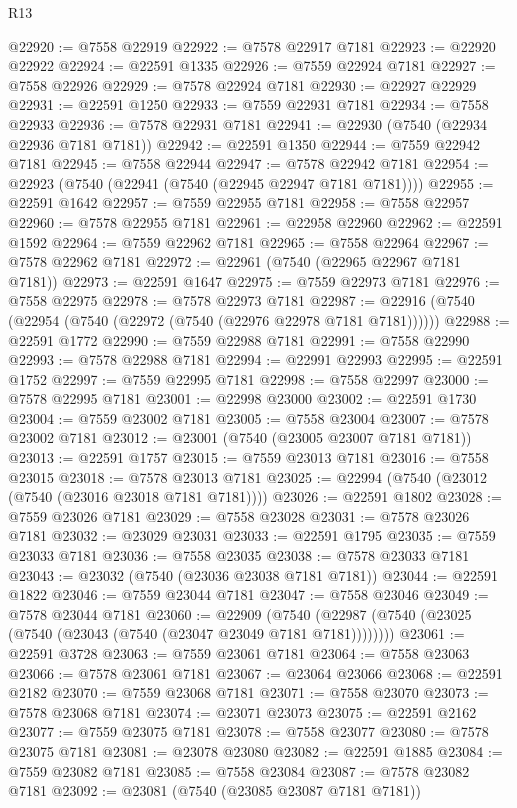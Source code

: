 \begin{lexlean}{R13}
\begin{coremodule}
@22920 := @7558 @22919
@22922 := @7578 @22917 @7181
@22923 := @22920 @22922
@22924 := @22591 @1335
@22926 := @7559 @22924 @7181
@22927 := @7558 @22926
@22929 := @7578 @22924 @7181
@22930 := @22927 @22929
@22931 := @22591 @1250
@22933 := @7559 @22931 @7181
@22934 := @7558 @22933
@22936 := @7578 @22931 @7181
@22941 := @22930 (@7540 (@22934 @22936 @7181 @7181))
@22942 := @22591 @1350
@22944 := @7559 @22942 @7181
@22945 := @7558 @22944
@22947 := @7578 @22942 @7181
@22954 := @22923 (@7540 (@22941 (@7540 (@22945 @22947 @7181 @7181))))
@22955 := @22591 @1642
@22957 := @7559 @22955 @7181
@22958 := @7558 @22957
@22960 := @7578 @22955 @7181
@22961 := @22958 @22960
@22962 := @22591 @1592
@22964 := @7559 @22962 @7181
@22965 := @7558 @22964
@22967 := @7578 @22962 @7181
@22972 := @22961 (@7540 (@22965 @22967 @7181 @7181))
@22973 := @22591 @1647
@22975 := @7559 @22973 @7181
@22976 := @7558 @22975
@22978 := @7578 @22973 @7181
@22987 := @22916 (@7540 (@22954 (@7540 (@22972 (@7540 (@22976 @22978 @7181 @7181))))))
@22988 := @22591 @1772
@22990 := @7559 @22988 @7181
@22991 := @7558 @22990
@22993 := @7578 @22988 @7181
@22994 := @22991 @22993
@22995 := @22591 @1752
@22997 := @7559 @22995 @7181
@22998 := @7558 @22997
@23000 := @7578 @22995 @7181
@23001 := @22998 @23000
@23002 := @22591 @1730
@23004 := @7559 @23002 @7181
@23005 := @7558 @23004
@23007 := @7578 @23002 @7181
@23012 := @23001 (@7540 (@23005 @23007 @7181 @7181))
@23013 := @22591 @1757
@23015 := @7559 @23013 @7181
@23016 := @7558 @23015
@23018 := @7578 @23013 @7181
@23025 := @22994 (@7540 (@23012 (@7540 (@23016 @23018 @7181 @7181))))
@23026 := @22591 @1802
@23028 := @7559 @23026 @7181
@23029 := @7558 @23028
@23031 := @7578 @23026 @7181
@23032 := @23029 @23031
@23033 := @22591 @1795
@23035 := @7559 @23033 @7181
@23036 := @7558 @23035
@23038 := @7578 @23033 @7181
@23043 := @23032 (@7540 (@23036 @23038 @7181 @7181))
@23044 := @22591 @1822
@23046 := @7559 @23044 @7181
@23047 := @7558 @23046
@23049 := @7578 @23044 @7181
@23060 := @22909
    (@7540 (@22987 (@7540 (@23025 (@7540 (@23043 (@7540 (@23047 @23049 @7181 @7181))))))))
@23061 := @22591 @3728
@23063 := @7559 @23061 @7181
@23064 := @7558 @23063
@23066 := @7578 @23061 @7181
@23067 := @23064 @23066
@23068 := @22591 @2182
@23070 := @7559 @23068 @7181
@23071 := @7558 @23070
@23073 := @7578 @23068 @7181
@23074 := @23071 @23073
@23075 := @22591 @2162
@23077 := @7559 @23075 @7181
@23078 := @7558 @23077
@23080 := @7578 @23075 @7181
@23081 := @23078 @23080
@23082 := @22591 @1885
@23084 := @7559 @23082 @7181
@23085 := @7558 @23084
@23087 := @7578 @23082 @7181
@23092 := @23081 (@7540 (@23085 @23087 @7181 @7181))

\end{coremodule}
\end{lexlean}
